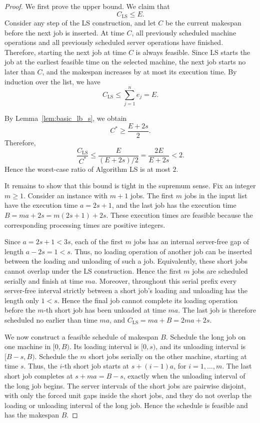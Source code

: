 \documentclass[11pt]{article}
\begin{document}
\begin{proof}
We first prove the upper bound. We claim that
\[
C_{\mathrm{LS}}\le E.
\]
Consider any step of the LS construction, and let \(C\) be the current makespan before
the next job is inserted. At time \(C\), all previously scheduled machine operations
and all previously scheduled server operations have finished. Therefore, starting the
next job at time \(C\) is always feasible. Since LS starts the job at the earliest feasible
time on the selected machine, the next job starts no later than \(C\), and the makespan
increases by at most its execution time. By induction over the list, we have
\[
C_{\mathrm{LS}}\le \sum_{j=1}^n e_j=E.
\]

By Lemma~\ref{lem:basic_lb_s}, we obtain 
\[
C^*\ge \frac{E+2s}{2}.
\]
Therefore,
\[
\frac{C_{\mathrm{LS}}}{C^*}
\le
\frac{E}{(E+2s)/2}
=
\frac{2E}{E+2s}
<2.
\]
Hence the worst-case ratio of Algorithm LS is at most \(2\).

It remains to show that this bound is tight in the supremum sense. Fix an integer
\(m\ge1\). Consider an instance with \(m+1\) jobs. The first \(m\) jobs in the input list have the execution time \(a=2s+1\), and the last job has the execution time \(B=ma+2s=m(2s+1)+2s\).
These execution times are feasible because the corresponding processing times are
positive integers.

Since \(a=2s+1<3s\), each of the first \(m\) jobs has an internal server-free gap of length \(a-2s=1<s\).
Thus, no loading operation of another job can be inserted between the loading and
unloading of such a job. Equivalently, these short jobs cannot overlap under the LS
construction. Hence the first \(m\) jobs are scheduled serially and finish at time \(ma\).
Moreover, throughout this serial prefix every server-free interval strictly between
a short job's loading and unloading has the length only \(1<s\). Hence the final job
cannot complete its loading operation before the \(m\)-th short job has been
unloaded at time \(ma\). The last job is therefore scheduled no earlier than time \(ma\), and \(C_{\mathrm{LS}}=ma+B=2ma+2s\).

We now construct a feasible schedule of makespan \(B\). Schedule the long job on one machine in \([0,B)\).
Its loading interval is \([0,s)\), and its unloading interval is \([B-s,B)\). Schedule the
\(m\) short jobs serially on the other machine, starting at time \(s\). Thus, the \(i\)-th short job starts at \(s+(i-1)a\), for \(i=1,\ldots,m\).
The last short job completes at \(s+ma=B-s\),
exactly when the unloading interval of the long job begins. The server intervals of
the short jobs are pairwise disjoint, with only the forced unit gaps inside the short
jobs, and they do not overlap the loading or unloading interval of the long job. Hence
the schedule is feasible and has the makespan \(B\).


\end{proof}
\end{document}
